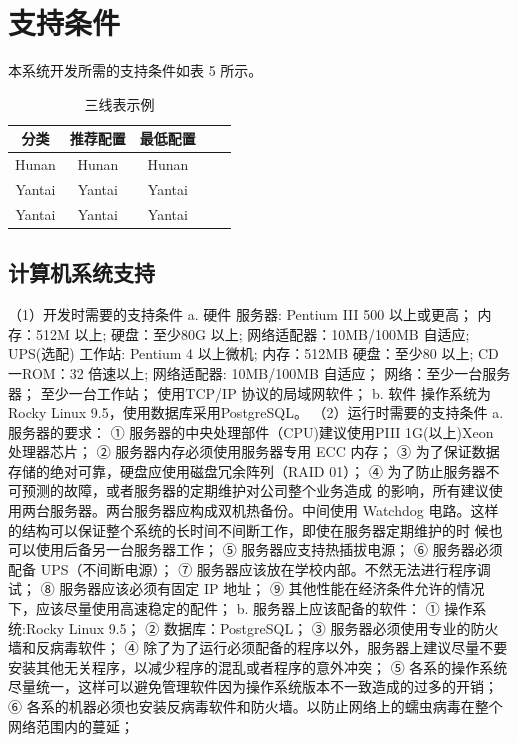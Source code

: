 \documentclass[
    report,     %
    oneside,    %
    UTF8,       %
    zihao=-4    %
]{config} %
\begin{document}
\section{支持条件}
本系统开发所需的支持条件如表 5 所示。
\begin{table}[H] %
    \centering %
    \caption{三线表示例} %
    \label{tab:three-line} %
    \renewcommand\arraystretch{0.85} %
    \setlength{\tabcolsep}{12pt} %
    \begin{tabular}{ccccc} %
        \toprule[1.5pt] %
        \textbf{分类} & \textbf{推荐配置} & \textbf{最低配置} \\ %
        \midrule[0.8pt] %
            Hunan & Hunan & Hunan \\ %
            Yantai & Yantai & Yantai \\ %
            Yantai & Yantai & Yantai \\ %
        \hline\hline %
    \end{tabular}
\end{table}
\subsection{计算机系统支持}
（1）开发时需要的支持条件
a. 硬件
服务器: Pentium III 500 以上或更高；
内存：512M 以上;
硬盘：至少80G 以上;
网络适配器：10MB/100MB 自适应;
UPS(选配)
工作站: Pentium 4 以上微机;
内存：512MB
硬盘：至少80 以上;
CD一ROM：32 倍速以上;
网络适配器: 10MB/100MB 自适应；
网络：至少一台服务器；
至少一台工作站；
使用TCP/IP 协议的局域网软件；
b. 软件
操作系统为Rocky Linux 9.5，使用数据库采用PostgreSQL。
（2）运行时需要的支持条件
a. 服务器的要求：
① 服务器的中央处理部件（CPU)建议使用PIII 1G(以上)Xeon 处理器芯片；
② 服务器内存必须使用服务器专用 ECC 内存；
③ 为了保证数据存储的绝对可靠，硬盘应使用磁盘冗余阵列（RAID 01）；
④ 为了防止服务器不可预测的故障，或者服务器的定期维护对公司整个业务造成
的影响，所有建议使用两台服务器。两台服务器应构成双机热备份。中间使用 Watchdog
电路。这样的结构可以保证整个系统的长时间不间断工作，即使在服务器定期维护的时
候也可以使用后备另一台服务器工作；
⑤ 服务器应支持热插拔电源；
⑥ 服务器必须配备 UPS（不间断电源）；
⑦ 服务器应该放在学校内部。不然无法进行程序调试；
⑧ 服务器应该必须有固定 IP 地址；
⑨ 其他性能在经济条件允许的情况下，应该尽量使用高速稳定的配件；
b. 服务器上应该配备的软件：
① 操作系统:Rocky Linux 9.5；
② 数据库：PostgreSQL；
③ 服务器必须使用专业的防火墙和反病毒软件；
④ 除了为了运行必须配备的程序以外，服务器上建议尽量不要安装其他无关程序，以减少程序的混乱或者程序的意外冲突；
⑤ 各系的操作系统尽量统一，这样可以避免管理软件因为操作系统版本不一致造成的过多的开销；
⑥ 各系的机器必须也安装反病毒软件和防火墙。以防止网络上的蠕虫病毒在整个网络范围内的蔓延；
\end{document}
